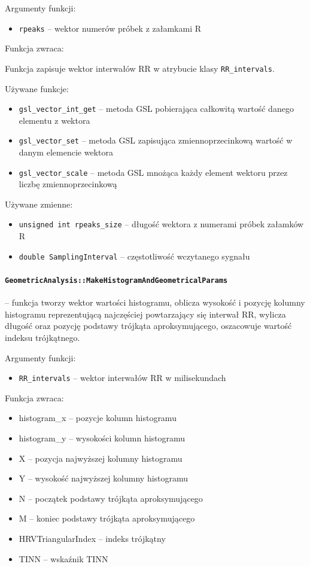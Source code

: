 \documentclass[a4paper, 11pt]{article}
\begin{document}
\medskip{}


Argumenty funkcji:
\begin{itemize}
\item \verb+rpeaks+ -- wektor numerów próbek z załamkami R
\end{itemize}
\medskip{}


Funkcja zwraca:

Funkcja zapisuje wektor interwałów RR w atrybucie klasy \verb+RR_intervals+.

\medskip{}


Używane funkcje:
\begin{itemize}
\item \verb+gsl_vector_int_get+ -- metoda GSL pobierająca całkowitą wartość danego
elementu z wektora
\item \verb+gsl_vector_set+ -- metoda GSL zapisująca zmiennoprzecinkową wartość
w danym elemencie wektora
\item \verb+gsl_vector_scale+ -- metoda GSL mnożąca każdy element wektoru przez
liczbę zmiennoprzecinkową
\end{itemize}
\medskip{}


Używane zmienne:
\begin{itemize}
\item \verb+unsigned int rpeaks_size+ -- długość wektora z numerami próbek załamków
R
\item \verb+double SamplingInterval+ -- częstotliwość wczytanego sygnału
\end{itemize}

\medskip{}

\paragraph{\texttt{GeometricAnalysis::MakeHistogramAndGeometricalParams}} -- funkcja tworzy wektor wartości histogramu, oblicza wysokość i pozycję
kolumny histogramu reprezentującą najczęściej powtarzający się interwał
RR, wylicza długość oraz pozycję podstawy trójkąta aproksymującego,
oszacowuje wartość indeksu trójkątnego.

\medskip{}


Argumenty funkcji:
\begin{itemize}
\item \verb+RR_intervals+ -- wektor interwałów RR w milisekundach
\end{itemize}
\medskip{}


Funkcja zwraca:
\begin{itemize}
\item histogram\_x -- pozycje kolumn histogramu
\item histogram\_y -- wysokości kolumn histogramu
\item X -- pozycja najwyższej kolumny histogramu
\item Y -- wysokość najwyższej kolumny histogramu
\item N -- początek podstawy trójkąta aproksymującego
\item M -- koniec podstawy trójkąta aproksymującego
\item HRVTriangularIndex -- indeks trójkątny
\item TINN -- wskaźnik TINN
\end{itemize}
\medskip{}
\end{document}

